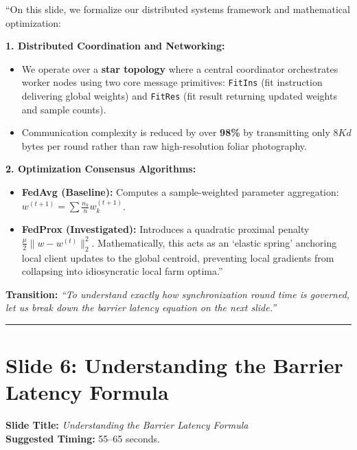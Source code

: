 \documentclass[11pt,a4paper]{article}
\begin{document}
\begin{tcolorbox}[colframe=darkgreen, title=\textbf{What to Say in the Presentation (Literal Script)}]
``On this slide, we formalize our distributed systems framework and mathematical optimization:

\textbf{1. Distributed Coordination and Networking:}
\begin{itemize}
    \item We operate over a \textbf{star topology} where a central coordinator orchestrates worker nodes using two core message primitives: \texttt{FitIns} (fit instruction delivering global weights) and \texttt{FitRes} (fit result returning updated weights and sample counts).
    \item Communication complexity is reduced by over \textbf{98\%} by transmitting only $8Kd$ bytes per round rather than raw high-resolution foliar photography.
\end{itemize}

\textbf{2. Optimization Consensus Algorithms:}
\begin{itemize}
    \item \textbf{FedAvg (Baseline):} Computes a sample-weighted parameter aggregation: $w^{(t+1)} = \sum \frac{n_k}{n} w_k^{(t+1)}$.
    \item \textbf{FedProx (Investigated):} Introduces a quadratic proximal penalty $\frac{\mu}{2}\|w - w^{(t)}\|_2^2$. Mathematically, this acts as an `elastic spring' anchoring local client updates to the global centroid, preventing local gradients from collapsing into idiosyncratic local farm optima.''
\end{itemize}
\end{tcolorbox}

\textbf{Transition:} \textit{``To understand exactly how synchronization round time is governed, let us break down the barrier latency equation on the next slide.''}

\vspace{0.35cm}\hrule\vspace{0.35cm}

\section{Slide 6: Understanding the Barrier Latency Formula}
\textbf{Slide Title:} \textit{Understanding the Barrier Latency Formula} \\
\textbf{Suggested Timing:} 55--65 seconds.
\end{document}
